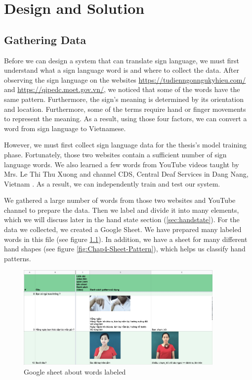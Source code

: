 \chapter{Design and Solution}
\section{Gathering Data}



Before we can design a system that can translate sign language, we must first understand what a sign language word is and where to collect the data. After observing the sign language on the websites \url{https://tudienngonngukyhieu.com/} and \url{https://qipedc.moet.gov.vn/}, we noticed that some of the words have the same pattern. Furthermore, the sign's meaning is determined by its orientation and location. Furthermore, some of the terms require hand or finger movements to represent the meaning. As a result, using those four factors, we can convert a word from sign language to Vietnamese.

However, we must first collect sign language data for the thesis's model training phase. Fortunately, those two websites contain a sufficient number of sign language words. We also learned a few words from YouTube videos taught by Mrs. Le Thi Thu Xuong \cite{yt:LeThiThuXuong} and channel CDS, Central Deaf Services in Dang Nang, Vietnam \cite{yt:CDS}. As a result, we can independently train and test our system.

We gathered a large number of words from those two websites and YouTube channel to prepare the data. Then we label and divide it into many elements, which we will discuss later in the hand state section (\ref{sec:handstate}). For the data we collected, we created a Google Sheet. We have prepared many labeled words in this file (see figure \ref{fig:Chap4-Label-Word}). In addition, we have a sheet for many different hand shapes (see figure \ref{fig:Chap4-Sheet-Pattern}), which helps us classify hand patterns.

\begin{figure}[H]
	\centering
	\includegraphics[width=0.9\textwidth]{img/Chap4/Label-Word.jpg}
	\caption{Google sheet about words labeled}
	\label{fig:Chap4-Label-Word}
\end{figure}

